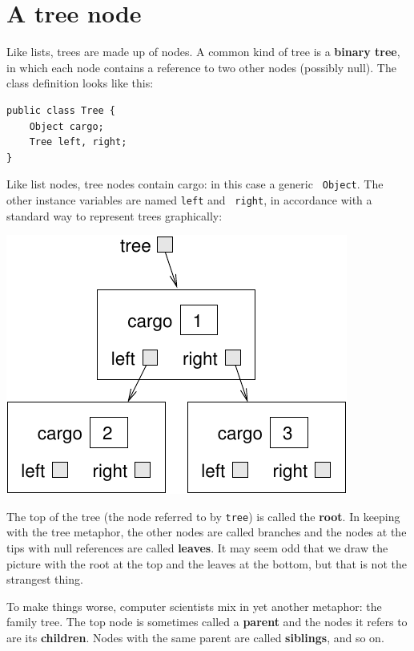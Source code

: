 \documentclass[12pt]{book}
\theoremstyle{exercise}
\begin{document}
\section{A tree node}

Like lists, trees are made up of nodes.  A common kind of tree is
a {\bf binary tree}, in which each node contains a reference to two
other nodes (possibly null).  The class definition looks like this:

\begin{verbatim}
public class Tree {
    Object cargo;
    Tree left, right;
}
\end{verbatim}
%
Like list nodes, tree nodes contain cargo: in this case a generic {\tt
Object}.  The other instance variables are named {\tt left} and {\tt
right}, in accordance with a standard way to represent trees
graphically:

\includegraphics{figs/tree1.pdf}

The top of the tree (the node referred to by {\tt tree}) is
called the {\bf root}.  In keeping with the tree
metaphor, the other nodes are called branches and the nodes
at the tips with null references are called {\bf leaves}.  It
may seem odd that we draw the picture with the root at the top
and the leaves at the bottom, but that is not the strangest thing.


To make things worse, computer scientists mix in yet another
metaphor: the family tree.  The top node is sometimes called
a {\bf parent} and the nodes it refers to are its {\bf children}.
Nodes with the same parent are called {\bf siblings}, and so on.
\end{document}
